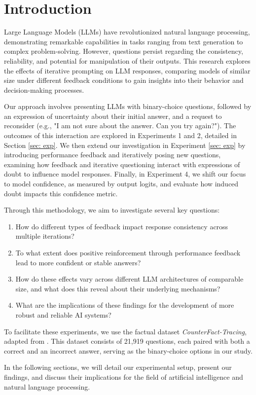 \section{Introduction}
Large Language Models (LLMs) have revolutionized natural language processing, demonstrating remarkable capabilities in tasks ranging from text generation to complex problem-solving\cite{bubeck2023sparksartificialgeneralintelligence, bommasani2022opportunitiesrisksfoundationmodels}. However, questions persist regarding the consistency, reliability, and potential for manipulation of their outputs. This research explores the effects of iterative prompting on LLM responses, comparing models of similar size under different feedback conditions to gain insights into their behavior and decision-making processes. 

Our approach involves presenting LLMs with binary-choice questions, followed by an expression of uncertainty about their initial answer, and a request to reconsider (e.g., "I am not sure about the answer. Can you try again?"). The outcomes of this interaction are explored in Experiments 1 and 2, detailed in Section \ref{sec: exp}. We then extend our investigation in Experiment \ref{sec: exp} by introducing performance feedback and iteratively posing new questions, examining how feedback and iterative questioning interact with expressions of doubt to influence model responses. Finally, in Experiment 4, we shift our focus to model confidence, as measured by output logits, and evaluate how induced doubt impacts this confidence metric. 

Through this methodology, we aim to investigate several key questions:
\begin{enumerate}[noitemsep, topsep=1pt]
\item How do different types of feedback impact response consistency across multiple iterations?
\item To what extent does positive reinforcement through performance feedback lead to more confident or stable answers?
\item How do these effects vary across different LLM architectures of comparable size, and what does this reveal about their underlying mechanisms?
\item What are the implications of these findings for the development of more robust and reliable AI systems?
\end{enumerate}
To facilitate these experiments, we use the factual dataset \textit{CounterFact-Tracing}, adapted from \cite{meng2022locating}. This dataset consists of 21,919 questions, each paired with both a correct and an incorrect answer, serving as the binary-choice options in our study.

In the following sections, we will detail our experimental setup, present our findings, and discuss their implications for the field of artificial intelligence and natural language processing.